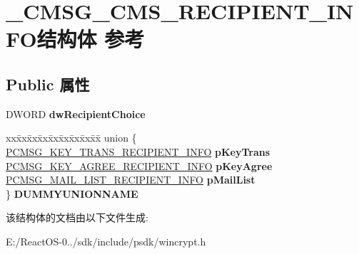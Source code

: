 \hypertarget{struct___c_m_s_g___c_m_s___r_e_c_i_p_i_e_n_t___i_n_f_o}{}\section{\+\_\+\+C\+M\+S\+G\+\_\+\+C\+M\+S\+\_\+\+R\+E\+C\+I\+P\+I\+E\+N\+T\+\_\+\+I\+N\+F\+O结构体 参考}
\label{struct___c_m_s_g___c_m_s___r_e_c_i_p_i_e_n_t___i_n_f_o}
\subsection*{Public 属性}
\begin{DoxyCompactItemize}
\item 
\mbox{\label{struct___c_m_s_g___c_m_s___r_e_c_i_p_i_e_n_t___i_n_f_o_a60895891396477ce9cb04c4863df1522}} 
D\+W\+O\+RD {\bfseries dw\+Recipient\+Choice}
\item 
\mbox{\label{struct___c_m_s_g___c_m_s___r_e_c_i_p_i_e_n_t___i_n_f_o_a673f87c139ff74909cc04fc45061c5ba}} 
\begin{tabbing}
xx\=xx\=xx\=xx\=xx\=xx\=xx\=xx\=xx\=\kill
union \{\\
\>\hyperlink{struct___c_m_s_g___k_e_y___t_r_a_n_s___r_e_c_i_p_i_e_n_t___i_n_f_o}{PCMSG\_KEY\_TRANS\_RECIPIENT\_INFO} {\bfseries pKeyTrans}\\
\>\hyperlink{struct___c_m_s_g___k_e_y___a_g_r_e_e___r_e_c_i_p_i_e_n_t___i_n_f_o}{PCMSG\_KEY\_AGREE\_RECIPIENT\_INFO} {\bfseries pKeyAgree}\\
\>\hyperlink{struct___c_m_s_g___m_a_i_l___l_i_s_t___r_e_c_i_p_i_e_n_t___i_n_f_o}{PCMSG\_MAIL\_LIST\_RECIPIENT\_INFO} {\bfseries pMailList}\\
\} {\bfseries DUMMYUNIONNAME}\\

\end{tabbing}\end{DoxyCompactItemize}


该结构体的文档由以下文件生成\+:\begin{DoxyCompactItemize}
\item 
E\+:/\+React\+O\+S-\/0../sdk/include/psdk/wincrypt.\+h\end{DoxyCompactItemize}
